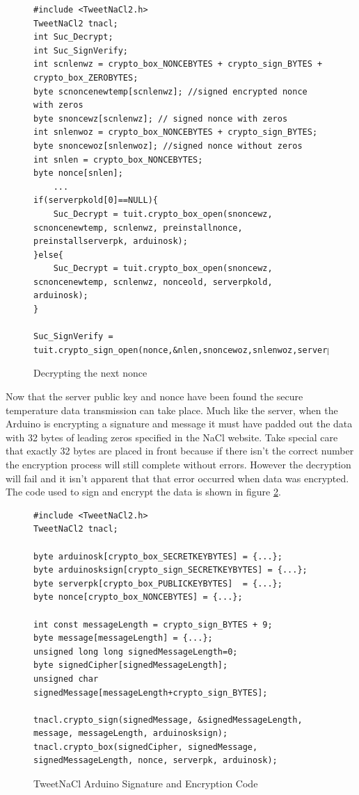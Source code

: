 \begin{figure}[H]
\begin{lstlisting}[style=Arduino]
#include <TweetNaCl2.h>
TweetNaCl2 tnacl;
int Suc_Decrypt;
int Suc_SignVerify;
int scnlenwz = crypto_box_NONCEBYTES + crypto_sign_BYTES + crypto_box_ZEROBYTES; 
byte scnoncenewtemp[scnlenwz]; //signed encrypted nonce with zeros
byte snoncewz[scnlenwz]; // signed nonce with zeros
int snlenwoz = crypto_box_NONCEBYTES + crypto_sign_BYTES;
byte snoncewoz[snlenwoz]; //signed nonce without zeros
int snlen = crypto_box_NONCEBYTES;
byte nonce[snlen];
	...
if(serverpkold[0]==NULL){
	Suc_Decrypt = tuit.crypto_box_open(snoncewz, scnoncenewtemp, scnlenwz, preinstallnonce, preinstallserverpk, arduinosk); 
}else{
	Suc_Decrypt = tuit.crypto_box_open(snoncewz, scnoncenewtemp, scnlenwz, nonceold, serverpkold, arduinosk);
}

Suc_SignVerify = tuit.crypto_sign_open(nonce,&nlen,snoncewoz,snlenwoz,serverpksign);

\end{lstlisting}
\caption{Decrypting the next nonce}
\label{snip:denonce}
\end{figure}

Now that the server public key and nonce have been found the secure temperature data transmission can take place. Much like the server, when the Arduino is encrypting a signature and message it must have padded out the data with 32 bytes of leading zeros specified in the NaCl website. Take special care that exactly 32 bytes are placed in front because if there isn't the correct number the encryption process will still complete without errors. However the decryption will fail and it isn't apparent that that error occurred when data was encrypted. The code used to sign and encrypt the data is shown in figure \ref{snip:nacl}.

\begin{figure}[H]
\begin{lstlisting}[style=Arduino]
#include <TweetNaCl2.h>
TweetNaCl2 tnacl;

byte arduinosk[crypto_box_SECRETKEYBYTES] = {...};
byte arduinosksign[crypto_sign_SECRETKEYBYTES] = {...};
byte serverpk[crypto_box_PUBLICKEYBYTES]  = {...};
byte nonce[crypto_box_NONCEBYTES] = {...};

int const messageLength = crypto_sign_BYTES + 9;
byte message[messageLength] = {...};
unsigned long long signedMessageLength=0;
byte signedCipher[signedMessageLength];
unsigned char signedMessage[messageLength+crypto_sign_BYTES];

tnacl.crypto_sign(signedMessage, &signedMessageLength, message, messageLength, arduinosksign);
tnacl.crypto_box(signedCipher, signedMessage, signedMessageLength, nonce, serverpk, arduinosk);
\end{lstlisting}
\caption{TweetNaCl Arduino Signature and Encryption Code}
\label{snip:nacl}
\end{figure}

